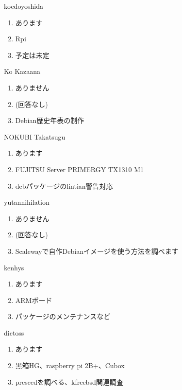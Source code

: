 \begin{prework}{ koedoyoshida }
  \begin{enumerate}
  \item あります
  \item Rpi
  \item 予定は未定
  \end{enumerate}
\end{prework}

\begin{prework}{ Ko Kazaana }
  \begin{enumerate}
  \item ありません
  \item (回答なし)
  \item Debian歴史年表の制作
  \end{enumerate}
\end{prework}

\begin{prework}{ NOKUBI Takatsugu }
  \begin{enumerate}
  \item あります
  \item FUJITSU Server PRIMERGY TX1310 M1
  \item debパッケージのlintian警告対応
  \end{enumerate}
\end{prework}

\begin{prework}{ yutannihilation }
  \begin{enumerate}
  \item ありません
  \item (回答なし)
  \item Scalewayで自作Debianイメージを使う方法を調べます
  \end{enumerate}
\end{prework}

\begin{prework}{ kenhys }
  \begin{enumerate}
  \item あります
  \item ARMボード
  \item パッケージのメンテナンスなど
  \end{enumerate}
\end{prework}

\begin{prework}{ dictoss }
  \begin{enumerate}
  \item あります
  \item 黒箱HG、raspberry pi 2B+、Cubox
  \item preseedを調べる、kfreebsd関連調査
  \end{enumerate}
\end{prework}

